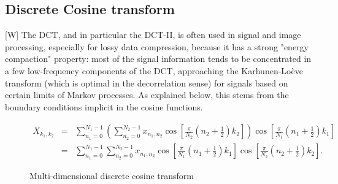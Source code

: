 \documentclass[12pt]{article}
\begin{document}
    \subsection{Discrete Cosine transform}
    [W] The DCT, and in particular the DCT-II, is often used in signal and image processing, especially
    for lossy data compression, because it has a strong "energy compaction" property: most of the 
    signal information tends to be concentrated in a few low-frequency components of the DCT, 
    approaching the Karhunen-Loève transform (which is optimal in the decorrelation sense) for signals 
    based on certain limits of Markov processes. As explained below, this stems from the boundary 
    conditions implicit in the cosine functions.
    \begin{figure}[h!]
    \begin{align}
        X_{k_1,k_2} &=&
        \sum_{n_1=0}^{N_1-1}
        \left( \sum_{n_2=0}^{N_2-1}
        x_{n_1,n_2} 
        \cos \left[\frac{\pi}{N_2} \left(n_2+\frac{1}{2}\right) k_2 \right]\right)
        \cos \left[\frac{\pi}{N_1} \left(n_1+\frac{1}{2}\right) k_1 \right]\\ &=&
        \sum_{n_1=0}^{N_1-1}
        \sum_{n_2=0}^{N_2-1}
        x_{n_1,n_2} 
        \cos \left[\frac{\pi}{N_1} \left(n_1+\frac{1}{2}\right) k_1 \right]
        \cos \left[\frac{\pi}{N_2} \left(n_2+\frac{1}{2}\right) k_2 \right] .
    \end{align}
    \caption{Multi-dimensional discrete cosine transform}
    \end{figure}
    
\end{document}
